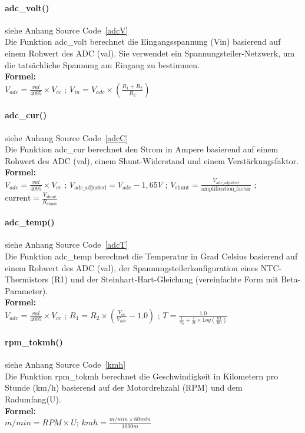\documentclass[paper=a4,11pt]{scrreprt}
\begin{document}
\paragraph{\textbf{adc\_volt()}} siehe Anhang Source Code~\ref{adcV}\\
Die Funktion adc\_volt berechnet die Eingangsspannung (Vin) basierend auf einem Rohwert des ADC (val). Sie verwendet ein Spannungsteiler-Netzwerk, um die tatsächliche Spannung am Eingang zu bestimmen.\\
\textbf{Formel:}\\ $V_{ adc } = \frac{ val }{ 4095 } \times V_{ cc }$ ; $V_{in} = V_{adc} \times \left( \frac{R_1 + R_2}{R_2} \right)$
\paragraph{\textbf{adc\_cur()}} siehe Anhang Source Code~\ref{adcC}\\
Die Funktion adc\_cur berechnet den Strom in Ampere basierend auf einem Rohwert des ADC (val), einem Shunt-Widerstand und einem Verstärkungsfaktor.\\
\textbf{Formel:}\\ $V_{ adc } = \frac{ val }{ 4095 } \times V_{ cc }$ ; $V_{\text{adc\_adjusted}} = V_{\text{adc}} - 1,65V$ ; $V_{\text{shunt}} = \frac{V_{\text{adc\_adjusted}}}{\text{amplification\_factor}}$ ; $\text{current} = \frac{V_{\text{shunt}}}{R_{\text{shunt}}}$
\paragraph{\textbf{adc\_temp()}} siehe Anhang Source Code~\ref{adcT}\\
Die Funktion adc\_temp berechnet die Temperatur in Grad Celsius basierend auf einem Rohwert des ADC (val), der Spannungsteilerkonfiguration eines NTC-Thermistors (R1) und der Steinhart-Hart-Gleichung (vereinfachte Form mit Beta-Parameter).\\
\textbf{Formel:}\\ $V_{ adc } = \frac{ val }{ 4095 } \times V_{ cc }$ ; $R_1 = R_2 \times \left( \frac{V_{cc}}{V_{\text{adc}}} - 1.0 \right)$ ; $T = \frac{ 1.0 }{\frac{ 1 }{ T_{ 0 } } + \frac{ 1 }{ B } \times 1og(\frac{ R1 }{ R0 }) }$
\paragraph{\textbf{rpm\_tokmh()}} siehe Anhang Source Code~\ref{kmh}\\
Die Funktion rpm\_tokmh berechnet die Geschwindigkeit in Kilometern pro Stunde (km/h) basierend auf der Motordrehzahl (RPM) und dem Radumfang(U).\\
\textbf{Formel:}\\ $m/min = RPM \times U$; $kmh = \frac{ m/min \times 60min }{ 1000m }$
\end{document}
